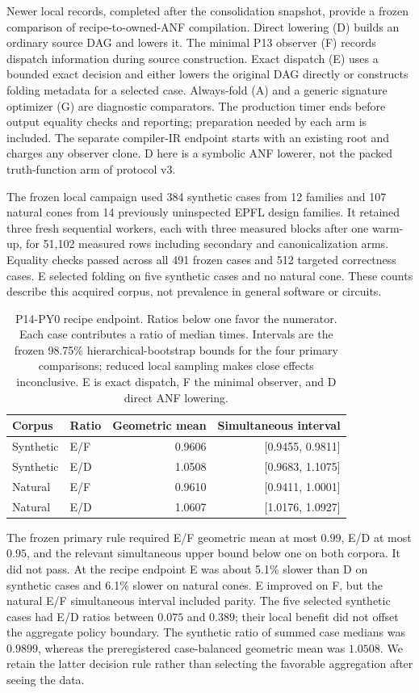\documentclass[11pt]{article}
\begin{document}
Newer local records, completed after the consolidation snapshot, provide a
frozen comparison of recipe-to-owned-ANF compilation. Direct lowering (D)
builds an ordinary source DAG and lowers it. The minimal P13 observer (F)
records dispatch information during source construction. Exact dispatch (E)
uses a bounded exact decision and either lowers the original DAG directly or
constructs folding metadata for a selected case. Always-fold (A) and a generic
signature optimizer (G) are diagnostic comparators. The production timer ends
before output equality checks and reporting; preparation needed by each arm
is included. The separate compiler-IR endpoint starts with an existing root
and charges any observer clone. D here is a symbolic ANF lowerer, not the
packed truth-function arm of protocol v3.

The frozen local campaign used 384 synthetic cases from 12 families and 107
natural cones from 14 previously uninspected EPFL design families. It retained
three fresh sequential workers, each with three measured blocks after one
warm-up, for 51,102 measured rows including secondary and canonicalization
arms. Equality checks passed across all 491 frozen cases and 512 targeted
correctness cases. E selected folding on five synthetic cases and no natural
cone. These counts describe this acquired corpus, not prevalence in general
software or circuits.

\begin{table}[ht]\centering\small
\begin{tabular}{llrr}\toprule
Corpus & Ratio & Geometric mean & Simultaneous interval\\\midrule
Synthetic & E/F & 0.9606 & [0.9455, 0.9811]\\
Synthetic & E/D & 1.0508 & [0.9683, 1.1075]\\
Natural & E/F & 0.9610 & [0.9411, 1.0001]\\
Natural & E/D & 1.0607 & [1.0176, 1.0927]\\

\bottomrule\end{tabular}
\caption{P14-PY0 recipe endpoint. Ratios below one favor the numerator.
Each case contributes a ratio of median times. Intervals are the frozen
98.75\% hierarchical-bootstrap bounds for the four primary comparisons;
reduced local sampling makes close effects inconclusive. E is exact dispatch,
F the minimal observer, and D direct ANF lowering.}\label{tab:p14}
\end{table}

The frozen primary rule required E/F geometric mean at most $0.99$, E/D at
most $0.95$, and the relevant simultaneous upper bound below one on both
corpora. It did not pass. At the recipe endpoint E was about 5.1\% slower
than D on synthetic cases and 6.1\% slower on natural cones. E improved on F,
but the natural E/F simultaneous interval included parity. The five selected
synthetic cases had E/D ratios between $0.075$ and $0.389$; their local benefit
did not offset the aggregate policy boundary. The synthetic ratio of summed
case medians was $0.9899$, whereas the preregistered case-balanced geometric
mean was $1.0508$. We retain the latter decision rule rather than selecting
the favorable aggregation after seeing the data.
\end{document}
